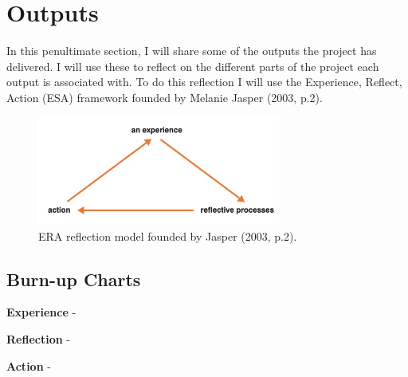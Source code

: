 \section{Outputs}
  In this penultimate section, I will share some of the outputs the project has delivered. I will use these to reflect on the different parts of the project
  each output is associated with. To do this reflection I will use the Experience, Reflect, Action (ESA) framework founded by Melanie Jasper (2003, p.2).

  \begin{figure}[H]
    \centering
    \includegraphics[width=8cm]{assets/eraReflection.png}
    \caption{ERA reflection model founded by Jasper (2003, p.2).}
    \label{fig:eraReflection}
  \end{figure}  

  \subsection{Burn-up Charts}
  \label{sec:burnup}

  \textbf{Experience} -

  \textbf{Reflection} -

  \textbf{Action} -

